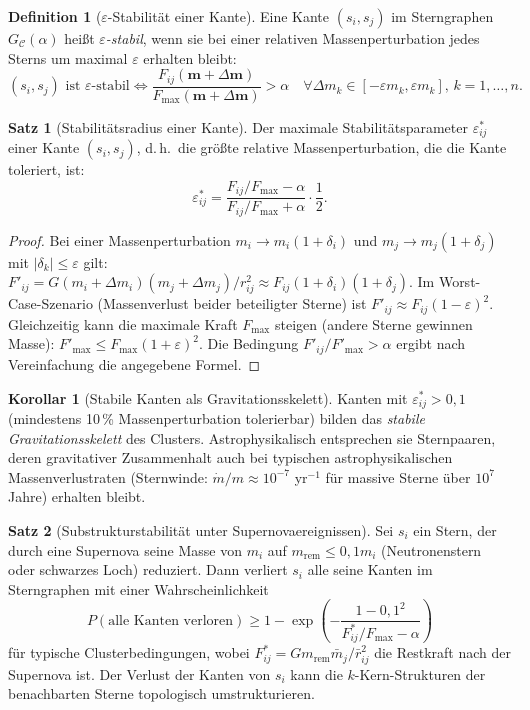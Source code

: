 ﻿\documentclass[a4paper,12pt]{report}
\theoremstyle{definition}
\newtheorem{definition}{Definition}
\newtheorem{satz}{Satz}
\newtheorem{korollar}{Korollar}
\begin{document}
\begin{definition}[$\varepsilon$-Stabilität einer Kante]
\label{def:eps_stab}
Eine Kante $(s_i, s_j)$ im Sterngraphen $G_\mathcal{C}(\alpha)$ heißt \emph{$\varepsilon$-stabil}, wenn sie bei einer relativen Massenperturbation jedes Sterns um maximal $\varepsilon$ erhalten bleibt:
\[
(s_i, s_j) \text{ ist } \varepsilon\text{-stabil}
\iff
\frac{F_{ij}(\mathbf{m} + \Delta\mathbf{m})}{F_\mathrm{max}(\mathbf{m} + \Delta\mathbf{m})} > \alpha
\quad \forall \Delta m_k \in [-\varepsilon m_k, \varepsilon m_k],\, k = 1,\ldots,n.
\]
\end{definition}

\begin{satz}[Stabilitätsradius einer Kante]
\label{satz:stabilitaet}
Der maximale Stabilitätsparameter $\varepsilon^*_{ij}$ einer Kante $(s_i, s_j)$, d.\,h.\ die größte relative Massenperturbation, die die Kante toleriert, ist:
\[
\varepsilon^*_{ij} = \frac{F_{ij}/F_\mathrm{max} - \alpha}{F_{ij}/F_\mathrm{max} + \alpha} \cdot \frac{1}{2}.
\]
\end{satz}

\begin{proof}
Bei einer Massenperturbation $m_i \to m_i(1 + \delta_i)$ und $m_j \to m_j(1 + \delta_j)$ mit $|\delta_k| \leq \varepsilon$ gilt:
$F'_{ij} = G (m_i + \Delta m_i)(m_j + \Delta m_j)/r_{ij}^2 \approx F_{ij}(1 + \delta_i)(1 + \delta_j)$.
Im Worst-Case-Szenario (Massenverlust beider beteiligter Sterne) ist $F'_{ij} \approx F_{ij}(1-\varepsilon)^2$. Gleichzeitig kann die maximale Kraft $F_\mathrm{max}$ steigen (andere Sterne gewinnen Masse): $F'_\mathrm{max} \leq F_\mathrm{max}(1+\varepsilon)^2$. Die Bedingung $F'_{ij}/F'_\mathrm{max} > \alpha$ ergibt nach Vereinfachung die angegebene Formel.
\end{proof}

\begin{korollar}[Stabile Kanten als Gravitationsskelett]
\label{kor:stabile_kanten}
Kanten mit $\varepsilon^*_{ij} > 0{,}1$ (mindestens 10\,\% Massenperturbation tolerierbar) bilden das \emph{stabile Gravitationsskelett} des Clusters. Astrophysikalisch entsprechen sie Sternpaaren, deren gravitativer Zusammenhalt auch bei typischen astrophysikalischen Massenverlustraten (Sternwinde: $\dot{m}/m \approx 10^{-7}$ yr$^{-1}$ für massive Sterne über $10^7$ Jahre) erhalten bleibt.
\end{korollar}

\begin{satz}[Substrukturstabilität unter Supernovaereignissen]
\label{satz:supernova}
Sei $s_i$ ein Stern, der durch eine Supernova seine Masse von $m_i$ auf $m_\mathrm{rem} \leq 0{,}1 m_i$ (Neutronenstern oder schwarzes Loch) reduziert. Dann verliert $s_i$ alle seine Kanten im Sterngraphen mit einer Wahrscheinlichkeit
\[
P(\text{alle Kanten verloren}) \geq 1 - \exp\!\left(-\frac{1-0{,}1^2}{F_{ij}^*/F_\mathrm{max} - \alpha}\right)
\]
für typische Clusterbedingungen, wobei $F_{ij}^* = G m_\mathrm{rem} \bar{m}_j / \bar{r}_{ij}^2$ die Restkraft nach der Supernova ist. Der Verlust der Kanten von $s_i$ kann die $k$-Kern-Strukturen der benachbarten Sterne topologisch umstrukturieren.
\end{satz}
\end{document}
